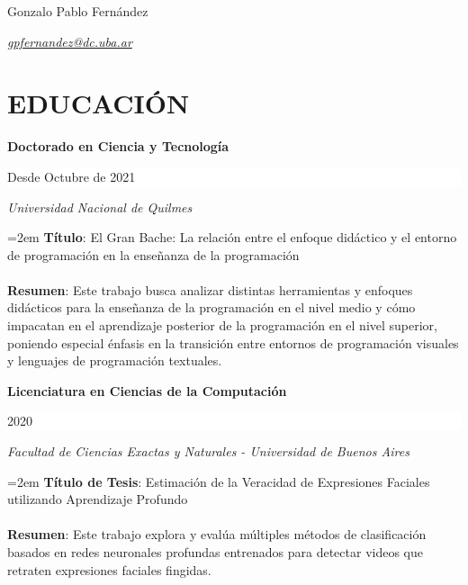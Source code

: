 \documentclass[paper=a4,fontsize=11pt]{scrartcl} %
\newcommand{\sepspace}{\vspace*{1em}}       %
\newcommand{\MyName}[1]{ %
        \Huge \usefont{OT1}{phv}{b}{n} \hfill #1
        \par \normalsize \normalfont}
\newcommand{\MySlogan}[1]{ %
        \large \usefont{OT1}{phv}{m}{n}\hfill \textit{#1}
        \par \normalsize \normalfont}
\newcommand{\NewPart}[1]{\section*{\uppercase{#1}}}
\newcommand{\PersonalEntry}[2]{
        \noindent\hangindent=0em\hangafter=0 %
        \parbox{10em}{        %
        \textit{#1}}               %
        \hspace{1.5em} #2 \par}    %
\newcommand{\EducationEntry}[4]{
        \noindent \textbf{#1} \hfill      %
        \colorbox{White}{%
            \parbox{10em}{%
            \hfill\color{Black}#2}} \par  %
        \noindent \textit{#3} \par        %
        \noindent\hangindent=2em\hangafter=0 \small #4 %
        \normalsize \par}
\begin{document}

\MyName{Gonzalo Pablo Fernández}
\MySlogan{\url{gpfernandez@dc.uba.ar}}

\sepspace



\NewPart{Educación}{}

  \EducationEntry{Doctorado en Ciencia y Tecnología}{Desde Octubre de 2021}{Universidad Nacional de Quilmes}
  {\textbf{Título}: El Gran Bache: La relación entre el enfoque didáctico y el entorno de programación en la enseñanza de la programación
  \\ \\
  \textbf{Resumen}: Este trabajo busca analizar distintas herramientas y enfoques didácticos para la enseñanza de la programación en el nivel medio
  y cómo impacatan en el aprendizaje posterior de la programación en el nivel superior, poniendo especial énfasis en la transición entre
  entornos de programación visuales y lenguajes de programación textuales.
  }

    \sepspace

  \EducationEntry{Licenciatura en Ciencias de la Computación}{2020}{Facultad de Ciencias Exactas y Naturales - Universidad de Buenos Aires}
  {\textbf{Título de Tesis}: Estimación de la Veracidad de Expresiones Faciales utilizando Aprendizaje Profundo
    \\ \\
    \textbf{Resumen}: Este trabajo explora y evalúa múltiples métodos de clasificación basados en redes neuronales profundas entrenados para detectar
    videos que retraten expresiones faciales fingidas.
  }
\end{document}
